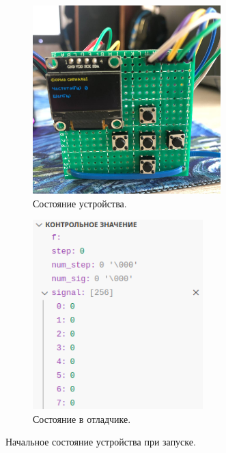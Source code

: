 	\begin{figure}[H]\captionsetup[subfigure]{font=normalsize}
     \begin{subfigure}[H]{0.5\textwidth}
         \centering
         \includegraphics[width=0.8\textwidth]{../image/test0_u_s.jpg}
         \caption{Состояние устройства.}
     \end{subfigure}
     \hfill
     \begin{subfigure}[H]{0.5\textwidth}
         \centering
         \includegraphics[width=0.725\textwidth]{../image/test0_o_s.png}
         \caption{Состояние в отладчике.}
     \end{subfigure}
        \caption{Начальное состояние устройства при запуске.}
	\end{figure}
	
